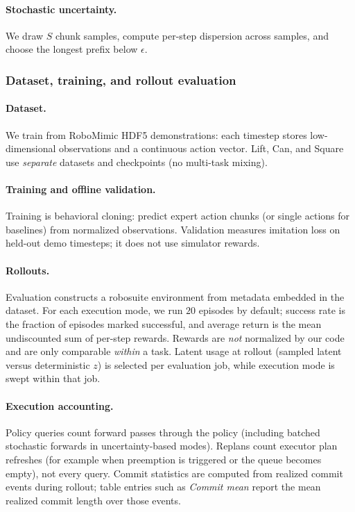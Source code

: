 \documentclass{article}
\begin{document}
\paragraph{Stochastic uncertainty.} We draw $S$ chunk samples, compute per-step dispersion across samples, and choose the longest prefix below $\epsilon$.

\subsubsection{Dataset, training, and rollout evaluation}
\paragraph{Dataset.} We train from RoboMimic HDF5 demonstrations: each timestep stores low-dimensional observations and a continuous action vector. Lift, Can, and Square use \emph{separate} datasets and checkpoints (no multi-task mixing).
\paragraph{Training and offline validation.} Training is behavioral cloning: predict expert action chunks (or single actions for baselines) from normalized observations. Validation measures imitation loss on held-out demo timesteps; it does not use simulator rewards.
\paragraph{Rollouts.} Evaluation constructs a robosuite environment from metadata embedded in the dataset. For each execution mode, we run $20$ episodes by default; success rate is the fraction of episodes marked successful, and average return is the mean undiscounted sum of per-step rewards. Rewards are \emph{not} normalized by our code and are only comparable \emph{within} a task. Latent usage at rollout (sampled latent versus deterministic $z$) is selected per evaluation job, while execution mode is swept within that job.
\paragraph{Execution accounting.} Policy queries count forward passes through the policy (including batched stochastic forwards in uncertainty-based modes). Replans count executor plan refreshes (for example when preemption is triggered or the queue becomes empty), not every query. Commit statistics are computed from realized commit events during rollout; table entries such as \emph{Commit mean} report the mean realized commit length over those events.
\end{document}
